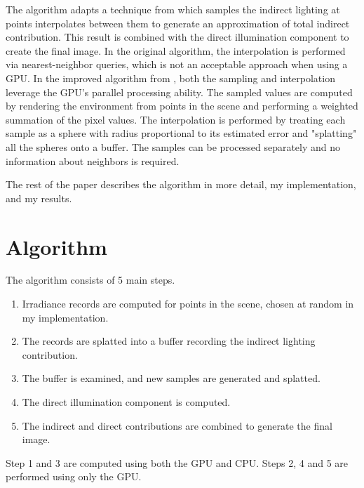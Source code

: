 \documentclass[10pt,twopage]{acmsiggraph}
\begin{document}
The algorithm adapts a technique from \cite{cook} which samples the indirect lighting at points interpolates between them to generate an approximation of total indirect contribution.  This result is combined with the direct illumination component to create the final image.  In the original algorithm, the interpolation is performed via nearest-neighbor queries, which is not an acceptable approach when using a GPU.  In the improved algorithm from \cite{mainpaper}, both the sampling and interpolation leverage the GPU's parallel processing ability.  The sampled values are computed by rendering the environment from points in the scene and performing a weighted summation of the pixel values.  The interpolation is performed by treating each sample as a sphere with radius proportional to its estimated error and "splatting" all the spheres onto a buffer.  The samples can be processed separately and no information about neighbors is required.

The rest of the paper describes the algorithm in more detail, my implementation, and my results.

\section{Algorithm}
The algorithm consists of 5 main steps.  
\begin{enumerate}
\item Irradiance records are computed for points in the scene, chosen at random in my implementation.  
\item The records are splatted into a buffer recording the indirect lighting contribution.  
\item The buffer is examined, and new samples are generated and splatted.  
\item The direct illumination component is computed.  
\item The indirect and direct contributions are combined to generate the final image.  
\end{enumerate}

Step 1 and 3 are computed using both the GPU and CPU.  Steps 2, 4 and 5 are performed using only the GPU.
\end{document}
